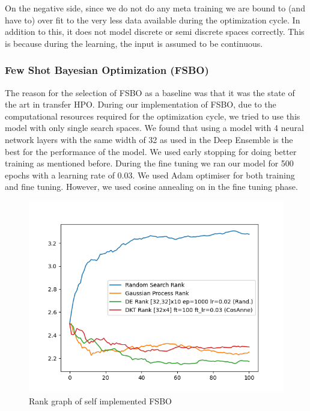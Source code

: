 \documentclass[12pt, twoside, ngerman]{report}
\begin{document}
On the negative side,  since we do not do any meta training we are bound to (and have to) over fit to the very less data available during the optimization cycle.
In addition to this,  it does not model discrete or semi discrete spaces correctly. 
This is because during the learning,  the input is assumed to be continuous.


\subsubsection{Few Shot Bayesian Optimization (FSBO)}

The reason for the selection of FSBO as a baseline was that it was the state of the art in transfer HPO.
During our implementation of FSBO,  due to the computational resources required for the optimization cycle,  we tried to use this model with only single search spaces.
We found that using a model with 4 neural network layers with the same width of 32 as used in the Deep Ensemble is the best for the performance of the model.
We used early stopping for doing better training as mentioned before.
During the fine tuning we ran our model for 500 epochs with a learning rate of 0.03.
We used Adam optimiser for both training and fine tuning.
However,  we used cosine annealing on in the fine tuning phase.

\begin{figure}[h]
  \centering
    \includegraphics[scale=0.5]{images/FSBOPerformance}
    \caption{Rank graph of self implemented FSBO}
    \label{fig:FSBOPerformance}
\end{figure}
\end{document}

